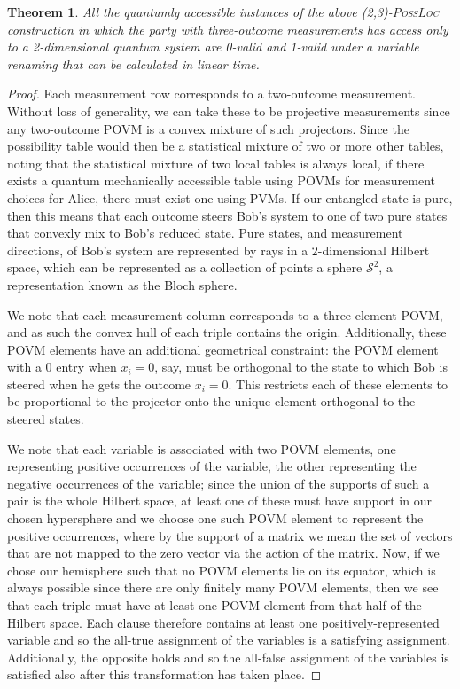 \documentclass[reprint]{revtex4-1}
\newtheorem{thm}{Theorem}
\theoremstyle{definition}
\begin{document}
\begin{thm}
All the quantumly accessible instances of the above \textsc{(2,3)-PossLoc} construction in which the party with three-outcome measurements has access only to a 2-dimensional quantum system are 0-valid and 1-valid under a variable renaming that can be calculated in linear time.


\end{thm}
\begin{proof}
Each measurement row corresponds to a two-outcome measurement. Without loss of generality, we can take these to be projective measurements since any two-outcome POVM is a convex mixture of such projectors. Since the possibility table would then be a statistical mixture of two or more other tables, noting that the statistical mixture of two local tables is always local, if there exists a quantum mechanically accessible table using POVMs for measurement choices for Alice, there must exist one using PVMs. If our entangled state is pure, then this means that each outcome steers Bob's system to one of two pure states that convexly mix to Bob's reduced state. Pure states, and measurement directions, of Bob's system are represented by rays in a $2$-dimensional Hilbert space, which can be represented as a collection of points a sphere $\mathcal{S}^2$, a representation known as the Bloch sphere.

We note that each measurement column corresponds to a three-element POVM, and as such the convex hull of each triple contains the origin. Additionally, these POVM elements have an additional geometrical constraint: the POVM element with a 0 entry when $x_i=0$, say, must be orthogonal to the state to which Bob is steered when he gets the outcome $x_i=0$. This restricts each of these elements to be proportional to the projector onto the unique element orthogonal to the steered states.

We note that each variable is associated with two POVM elements, one representing positive occurrences of the variable, the other representing the negative occurrences of the variable; since the union of the supports of such a pair is the whole Hilbert space, at least one of these must have support in our chosen hypersphere and we choose one such POVM element to represent the positive occurrences, where by the support of a matrix we mean the set of vectors that are not mapped to the zero vector via the action of the matrix. Now, if we chose our hemisphere such that no POVM elements lie on its equator, which is always possible since there are only finitely many POVM elements, then we see that each triple must have at least one POVM element from that half of the Hilbert space. Each clause therefore contains at least one positively-represented variable and so the all-true assignment of the variables is a satisfying assignment. Additionally, the opposite holds and so the all-false assignment of the variables is satisfied also after this transformation has taken place.


\end{proof}
\end{document}
